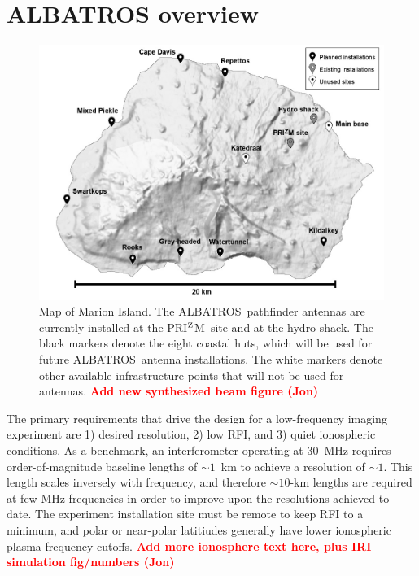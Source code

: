 \documentclass{ws-jai}
\def\albatros{ALBATROS}
\def\prizm{PRI$^{\rm Z}$M}
\newcommand{\attention}[1]{\textcolor{red}{\bf {#1}}}
\begin{document}
\section{ALBATROS overview}

\begin{figure}
  \begin{center}
    \includegraphics[width=0.7\linewidth]{Figures/marion_map/marion_map_annotated.jpg}
    \caption{Map of Marion Island.  The \albatros\ pathfinder antennas
      are currently installed at the \prizm\ site and at the hydro
      shack.  The black markers denote the eight coastal huts, which
      will be used for future \albatros\ antenna installations.  The
      white markers denote other available infrastructure points that
      will not be used for antennas.  \attention{Add new
        synthesized beam figure (Jon)}}
    \label{Fig:marion}
  \end{center}
\end{figure}




The primary requirements that drive the design for a low-frequency
imaging experiment are 1) desired resolution, 2) low RFI, and 3) quiet
ionospheric conditions.  As a benchmark, an interferometer operating
at 30~MHz requires order-of-magnitude baseline lengths of $\sim 1$~km
to achieve a resolution of $\sim 1$\degree.  This length scales
inversely with frequency, and therefore $\sim 10$-km lengths are
required at few-MHz frequencies in order to improve upon the
resolutions achieved to date.  The experiment installation site must
be remote to keep RFI to a minimum, and polar or near-polar latitiudes
generally have lower ionospheric plasma frequency cutoffs.
\attention{Add more ionosphere text here, plus IRI simulation
  fig/numbers (Jon)}
\end{document}
